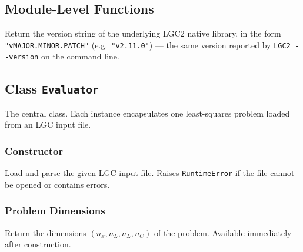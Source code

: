 \documentclass[a4paper,11pt]{article}
\newcommand{\code}[1]{\texttt{#1}}
\begin{document}
\subsection{Module-Level Functions}

\begin{description}[style=nextline, leftmargin=1.5em]
\item[\code{getLGCVersion() -> str}]
    Return the version string of the underlying LGC2 native library, in
    the form \code{"vMAJOR.MINOR.PATCH"} (e.g.\ \code{"v2.11.0"}) --- the
    same version reported by \code{LGC2 -{}-version} on the command line.
\end{description}

\subsection{Class \code{Evaluator}}

The central class. Each instance encapsulates one least-squares problem
loaded from an LGC input file.

\subsubsection*{Constructor}

\begin{description}[style=nextline, leftmargin=1.5em]
\item[\code{Evaluator(filePath: str)}]
    Load and parse the given LGC input file. Raises \code{RuntimeError}
    if the file cannot be opened or contains errors.
\end{description}

\subsubsection*{Problem Dimensions}

\begin{description}[style=nextline, leftmargin=1.5em]
\item[\code{getProblemDimensions() -> UEOIndices}]
    Return the dimensions $(n_x, n_L, n_L, n_C)$ of the problem. Available
    immediately after construction.
\end{description}
\end{document}
